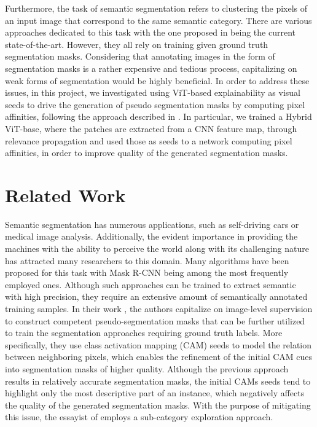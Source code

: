Furthermore, the task of semantic segmentation refers to clustering the pixels of an input image that correspond to the same semantic category. There are various approaches dedicated to this task with the one proposed in \cite{panoptic} being the current state-of-the-art. However, they all rely on training given ground truth segmentation masks. Considering that annotating images in the form of segmentation masks is a rather expensive and tedious process, capitalizing on weak forms of segmentation would be highly beneficial. In order to address these issues, in this project, we investigated using ViT-based explainability as visual seeds to drive the generation of pseudo segmentation masks by computing pixel affinities, following the approach described in \cite{ahn2018learning}. In particular, we trained a Hybrid ViT-base, where the patches are extracted from a CNN feature map, through relevance propagation and used those as seeds to a network computing pixel affinities, in order to improve quality of the generated segmentation masks. 

\section{Related Work}
Semantic segmentation has numerous applications, such as self-driving cars or medical image analysis.  Additionally, the evident importance in providing the machines with the ability to perceive the world along with its challenging nature has attracted many researchers to this domain. Many algorithms have been proposed for this task with Mask R-CNN \cite{he2017mask} being among the most frequently employed ones. Although such  approaches can be trained to extract semantic with high precision, they require an extensive amount of semantically annotated training samples. In their work \cite{ahn2018learning}, the authors capitalize on image-level supervision to construct competent pseudo-segmentation masks that can be further utilized to train the segmentation approaches requiring ground truth labels. More specifically, they use class activation mapping (CAM) \cite{zhou2016learning} seeds to model the relation between neighboring pixels, which enables the refinement of the initial CAM cues into segmentation masks of higher quality. Although the previous approach results in relatively accurate segmentation masks, the initial CAMs seeds tend to highlight only the most descriptive part of an instance, which negatively affects the quality of the generated segmentation masks. With the purpose of mitigating this issue, the essayist of \cite{chang2020weakly} employs a sub-category exploration approach. 

